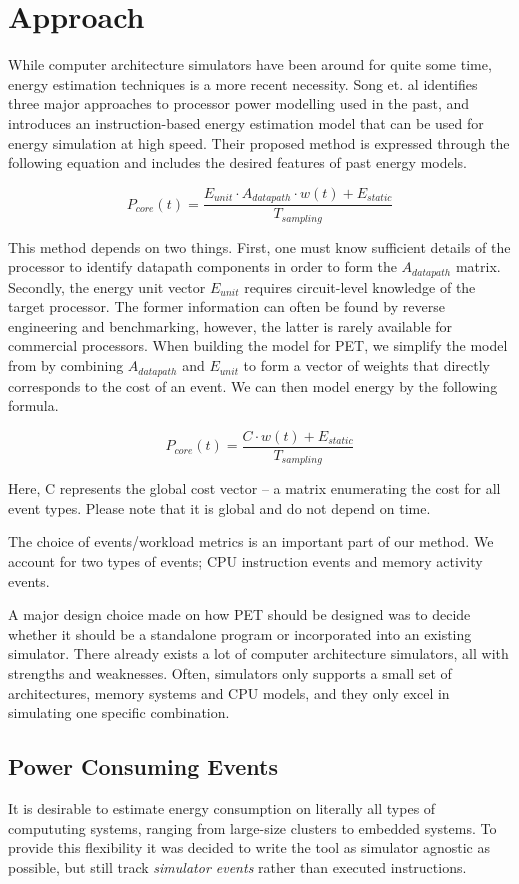 \section{Approach}

While computer architecture simulators have been around for quite some time,
energy estimation techniques is a more recent necessity. Song et. al
\cite{song2012instruction} identifies three major approaches to processor power
modelling used in the past, and introduces an instruction-based energy
estimation model that can be used for energy simulation at high speed. Their
proposed method is expressed through the following equation and includes the
desired features of past energy models.

\[
    P_{core}(t) = \frac{E_{unit} \cdot A_{datapath} \cdot w(t) +
    E_{static}}{T_{sampling}}
\]

This method depends on two things. First, one must know sufficient details of
the processor to identify datapath components in order to form the
$A_{datapath}$ matrix. Secondly, the energy unit vector $E_{unit}$ requires
circuit-level knowledge of the target processor. The former information can
often be found by reverse engineering and benchmarking, however, the latter is
rarely available for commercial processors. When building the model for PET, we
simplify the model from \cite{song2012instruction} by combining $A_{datapath}$
and $E_{unit}$ to form a vector of weights that directly corresponds to the cost
of an event. We can then model energy by the following formula.

\[
    P_{core}(t) = \frac{C \cdot w(t) + E_{static}}{T_{sampling}}
\]

Here, C represents the global cost vector -- a matrix enumerating the cost
for all event types. Please note that it is global and do not depend on time.

The choice of events/workload metrics is an important part of our method. We
account for two types of events; CPU instruction events and memory activity
events.

A major design choice made on how PET should be designed was to decide whether
it should be a standalone program or incorporated into an existing simulator.
There already exists a lot of computer architecture simulators, all with
strengths and weaknesses. Often, simulators only supports a small set of
architectures, memory systems and CPU models, and they only excel in simulating
one specific combination.


\subsection{Power Consuming Events}
\label{subsec:powerevents}
It is desirable to estimate energy consumption on literally all types of
compututing systems, ranging from large-size clusters to embedded systems. To
provide this flexibility it was decided to write the tool as simulator agnostic
as possible, but still track \emph{simulator events} rather than executed instructions.

